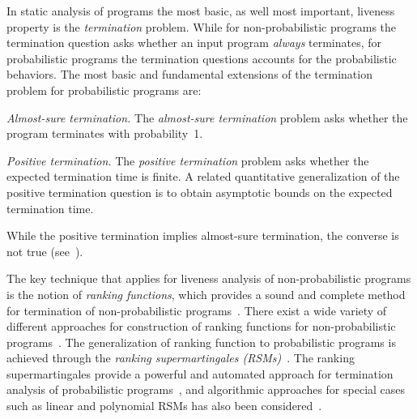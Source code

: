 \smallskip{} 
In static analysis of programs the most basic, as well most important, 
liveness property is the {\em termination} problem.
While for non-probabilistic programs the termination question asks whether
an input program {\em always} terminates, for probabilistic programs 
the termination questions accounts for the probabilistic behaviors. 
The most basic and fundamental extensions of the termination problem 
for probabilistic programs are:

\begin{compactenum}
\item \emph{Almost-sure termination.} 
The \emph{almost-sure termination} problem asks whether the program terminates with probability~1.


\item \emph{Positive termination.} 
The \emph{positive termination} problem asks whether the expected termination time is finite.
A related quantitative generalization of the positive termination question is to obtain 
asymptotic bounds on the expected termination time.

\end{compactenum}
While the positive termination implies almost-sure termination, the converse is not true (see~\cite[]{}).




\smallskip{}
The key technique that applies for liveness analysis of non-probabilistic programs is 
the notion of {\em ranking functions}, which provides a sound and complete 
method for termination of non-probabilistic programs~\cite{rwfloyd1967programs}.
There exist a wide variety of different approaches for construction 
of ranking functions for non-probabilistic programs~\cite{DBLP:conf/cav/BradleyMS05,DBLP:conf/tacas/ColonS01,DBLP:conf/vmcai/PodelskiR04,DBLP:conf/pods/SohnG91}.
The generalization of ranking function to probabilistic programs is achieved through the
{\em ranking supermartingales (RSMs)}~\cite{}.
The ranking supermartingales provide a powerful and automated approach for termination 
analysis of probabilistic programs~\cite{SRIRAM,HOLGER,HONGFEI}, and algorithmic 
approaches for special cases such as linear and polynomial RSMs has
also been considered~\cite{POPL,CAV,POPL}.




